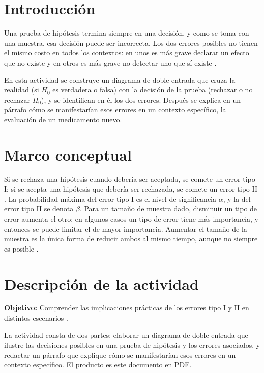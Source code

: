 \documentclass[11pt,letterpaper]{article}
\begin{document}
\portada
\indicegeneral


\section{Introducción}

Una prueba de hipótesis termina siempre en una decisión, y como se toma con una muestra, esa decisión puede ser incorrecta. Los dos errores posibles no tienen el mismo costo en todos los contextos: en unos es más grave declarar un efecto que no existe y en otros es más grave no detectar uno que sí existe \parencite{tecnm2026_documento_fuente}.

En esta actividad se construye un diagrama de doble entrada que cruza la realidad (si $H_0$ es verdadera o falsa) con la decisión de la prueba (rechazar o no rechazar $H_0$), y se identifican en él los dos errores. Después se explica en un párrafo cómo se manifestarían esos errores en un contexto específico, la evaluación de un medicamento nuevo.

\section{Marco conceptual}

Si se rechaza una hipótesis cuando debería ser aceptada, se comete un error tipo I; si se acepta una hipótesis que debería ser rechazada, se comete un error tipo II \parencite{tecnm2026_documento_fuente}. La probabilidad máxima del error tipo I es el nivel de significancia $\alpha$, y la del error tipo II se denota $\beta$. Para un tamaño de muestra dado, disminuir un tipo de error aumenta el otro; en algunos casos un tipo de error tiene más importancia, y entonces se puede limitar el de mayor importancia. Aumentar el tamaño de la muestra es la única forma de reducir ambos al mismo tiempo, aunque no siempre es posible \parencite{tecnm2026_documento_fuente}.

\section{Descripción de la actividad}

\textbf{Objetivo:} Comprender las implicaciones prácticas de los errores tipo I y II en distintos escenarios \parencite{tecnm2026_documento_fuente}.

La actividad consta de dos partes: elaborar un diagrama de doble entrada que ilustre las decisiones posibles en una prueba de hipótesis y los errores asociados, y redactar un párrafo que explique cómo se manifestarían esos errores en un contexto específico. El producto es este documento en PDF.
\end{document}
